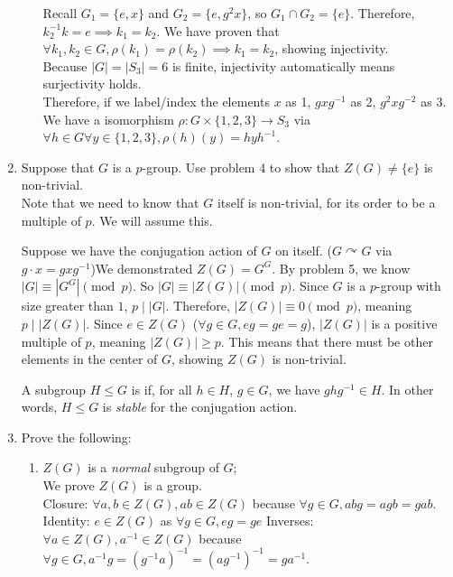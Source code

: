 \documentclass{amsart}
\begin{document}
\begin{enumerate}
\begin{enumerate}
    Recall $G_1=\{e,x\}$ and $G_2=\{e,g^2x\}$, so $G_1\cap G_2=\{e\}$. Therefore, $k_2^{-1}k=e\implies k_1=k_2$. We have proven that $\forall k_1,k_2\in G,\rho(k_1)=\rho(k_2)\implies k_1=k_2$, showing injectivity.\\

    Because $|G|=|S_3|=6$ is finite, injectivity automatically means surjectivity holds. \\

    Therefore, if we label/index the elements $x$ as 1, $gxg^{-1}$ as 2, $g^2xg^{-2}$ as 3. We have a isomorphism $\rho:G\times\{1,2,3\}\to S_3$ via $\forall h\in G\forall y\in\{1,2,3\},\rho(h)(y)=hyh^{-1}$.    
\end{enumerate}


\vspace{0.2in}


\item Suppose that $G$ is a $p$-group. Use problem 4 to show that $Z(G)\neq \{e\}$ is non-trivial.\\

Note that we need to know that $G$ itself is non-trivial, for its order to be a multiple of $p$. We will assume this.

Suppose we have the conjugation action of $G$ on itself. ($G\curvearrowright G$ via $g\cdot x=gxg^{-1}$)We demonstrated $Z(G)=G^G$. By problem 5, we know $|G|\equiv|G^G|\pmod p$. So $|G|\equiv |Z(G)|\pmod p$. Since $G$ is a $p$-group with size greater than $1$, $p\mid |G|$. Therefore, $|Z(G)|\equiv 0\pmod p$, meaning $p\mid |Z(G)|$. Since $e\in Z(G)$ ($\forall g\in G,eg=ge=g$), $|Z(G)|$ is a positive multiple of $p$, meaning $|Z(G)|\geq p$. This means that there must be other elements in the center of $G$, showing $Z(G)$ is non-trivial.


\vspace{0.2in}

A subgroup $H\leq G$ is  if, for all $h\in H$, $g\in G$, we have $ghg^{-1}\in H$. In other words, $H\leq G$ is \emph{stable} for the conjugation action.

\item Prove the following:
\begin{enumerate}
	\item $Z(G)$ is a \emph{normal} subgroup of $G$;\\

    We prove $Z(G)$ is a group.\\

    Closure: $\forall a,b\in Z(G),ab\in Z(G)$ because $\forall g\in G,abg=agb=gab$.
    Identity: $e\in Z(G)$ as $\forall g\in G,eg=ge$
    Inverses: $\forall a\in Z(G),a^{-1}\in Z(G)$ because $\forall g\in G,a^{-1}g=(g^{-1}a)^{-1}=(ag^{-1})^{-1}=ga^{-1}$.\\


\end{enumerate}
\end{enumerate}
\end{document}
